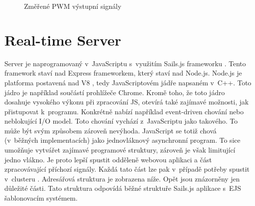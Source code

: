 \begin{figure}[H]
    \centering
	\caption{Změřené PWM výstupní signály}
	\label{fig:pwm}
\end{figure}

\section{Real-time Server}
Server je naprogramovaný v~JavaScriptu s~využitím Sails.js  frameworku \cite{sails}. Tento framework staví nad Express frameworkem, který staví nad Node.js. Node.js je platforma postavená nad V8 \cite{v8}, tedy JavaScriptovém jádře napsaném v~C++. Toto jádro je například součástí prohlížeče Chrome.  Kromě toho, že toto jádro dosahuje vysokého výkonu při zpracování JS, otevírá také zajímavé možnosti, jak přistupovat k~programu. Konkrétně nabízí například event-driven chování nebo neblokující I/O model. Toto chování vychází z~JavaScriptu jako takového. To může být svým způsobem zároveň nevýhoda. JavaScript se totiž chová (v~běžných implementacích) jako jednovláknový asynchronní program. To sice umožňuje vytvářet zajímavé programové struktury, zároveň je však limitující jedno vlákno. Je proto lepší spustit odděleně webovou aplikaci a část zpracovávající příchozí signály. Každá tato část lze pak v~případě potřeby spustit v~clusteru \cite{cluster}. Adresářová struktura je zobrazena níže. Opět jsou znázorněny jen důležité části. Tato struktura odpovídá běžné struktuře Sails.js \cite{sails} aplikace s~EJS šablonovacím systémem.

